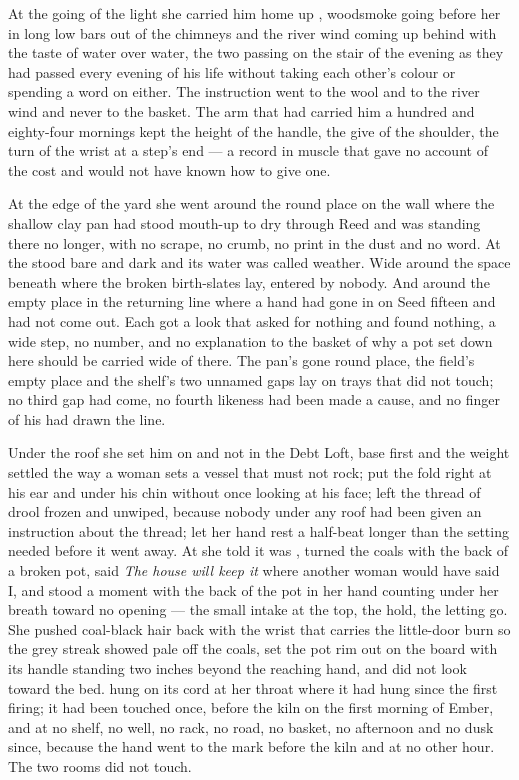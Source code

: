 \scenebreak

At the going of the light she carried him home up , woodsmoke going before her in long low bars out of the chimneys and the river wind coming up behind with the taste of water over water, the two passing on the stair of the evening as they had passed every evening of his life without taking each other's colour or spending a word on either. The instruction went to the wool and to the river wind and never to the basket. The arm that had carried him a hundred and eighty-four mornings kept the height of the handle, the give of the shoulder, the turn of the wrist at a step's end --- a record in muscle that gave no account of the cost and would not have known how to give one.

At the edge of the yard she went around the round place on the wall where the shallow clay pan had stood mouth-up to dry through Reed and was standing there no longer, with no scrape, no crumb, no print in the dust and no word. At  the  stood bare and dark and its water was called weather. Wide around the space beneath  where the broken birth-slates lay, entered by nobody. And around the empty place in the returning line where a hand had gone in on Seed fifteen and had not come out. Each got a look that asked for nothing and found nothing, a wide step, no number, and no explanation to the basket of why a pot set down here should be carried wide of there. The pan's gone round place, the field's empty place and the shelf's two unnamed gaps lay on trays that did not touch; no third gap had come, no fourth likeness had been made a cause, and no finger of his had drawn the line.

\scenebreak

Under the roof she set him on  and not in the Debt Loft, base first and the weight settled the way a woman sets a vessel that must not rock; put the fold right at his ear and under his chin without once looking at his face; left the thread of drool frozen and unwiped, because nobody under any roof had been given an instruction about the thread; let her hand rest a half-beat longer than the setting needed before it went away. At  she told  it was , turned the coals with the back of a broken pot, said \emph{The house will keep it} where another woman would have said I, and stood a moment with the back of the pot in her hand counting under her breath toward no opening --- the small intake at the top, the hold, the letting go. She pushed coal-black hair back with the wrist that carries the little-door burn so the grey streak showed pale off the coals, set the pot rim out on the board with its handle standing two inches beyond the reaching hand, and did not look toward the bed.  hung on its cord at her throat where it had hung since the first firing; it had been touched once, before the kiln on the first morning of Ember, and at no shelf, no well, no rack, no road, no basket, no afternoon and no dusk since, because the hand went to the mark before the kiln and at no other hour. The two rooms did not touch.

